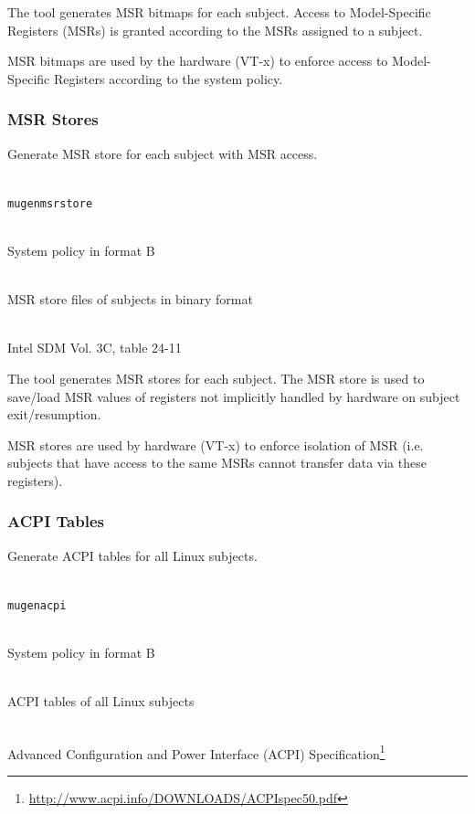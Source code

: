 \documentclass[a4paper,twoside,titlepage]{article}
\begin{document}
The tool generates MSR bitmaps for each subject. Access to Model-Specific
Registers (MSRs) is granted according to the MSRs assigned to a subject.

MSR bitmaps are used by the hardware (VT-x) to enforce access to Model-Specific
Registers according to the system policy.

\subsubsection{MSR Stores}
Generate MSR store for each subject with MSR access.

\begin{description} \itemsep1pt \parskip0pt
	\item[Name] \hfill \\
		\texttt{mugenmsrstore}
	\item[Input] \hfill \\
		System policy in format B
	\item[Output] \hfill \\
		MSR store files of subjects in binary format
	\item[Output format] \hfill \\
		Intel SDM Vol. 3C, table 24-11
\end{description}

The tool generates MSR stores for each subject. The MSR store is used to
save/load MSR values of registers not implicitly handled by hardware on subject
exit/resumption.

MSR stores are used by hardware (VT-x) to enforce isolation of MSR (i.e.
subjects that have access to the same MSRs cannot transfer data via these
registers).

\subsubsection{ACPI Tables}
Generate ACPI tables for all Linux subjects.

\begin{description} \itemsep1pt \parskip0pt
	\item[Name] \hfill \\
		\texttt{mugenacpi}
	\item[Input] \hfill \\
		System policy in format B
	\item[Output] \hfill \\
		ACPI tables of all Linux subjects
	\item[Output format] \hfill \\
		Advanced Configuration and Power Interface (ACPI)
		Specification\footnote{\url{http://www.acpi.info/DOWNLOADS/ACPIspec50.pdf}}
\end{description}
\end{document}
